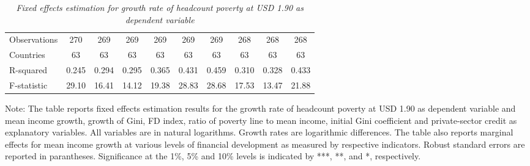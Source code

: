 \documentclass[12pt, a4paper]{article}
\begin{document}
\begin{table}[htbp]
\begin{threeparttable}
{\begin{tabular}{l*{9}{c}}
					
					\hline
					Observations        &         270         &         269         &         269         &         269         &         269         &         269         &         268         &         268         &         268         \\
					Countries           &          63         &          63         &          63         &          63         &          63         &          63         &          63         &          63         &          63         \\
					R-squared           &       0.245         &       0.294         &       0.295         &       0.365         &       0.431         &       0.459         &       0.310         &       0.328         &       0.433         \\
					F-statistic         &       29.10         &       16.41         &       14.12         &       19.38         &       28.83         &       28.68         &       17.53         &       13.47         &       21.88         \\
					\hline\hline
				\end{tabular}
			}
			\begin{tablenotes}
				\item \scriptsize{Note: The table reports fixed effects estimation results for the growth rate of headcount poverty at USD 1.90 as dependent variable and mean income growth, growth of Gini, FD index, ratio of poverty line to mean income, initial Gini coefficient and private-sector credit as explanatory variables. All variables are in natural logarithms. Growth rates are logarithmic differences. The table also reports marginal effects for mean income growth at various levels of financial development as measured by respective indicators. Robust standard errors are reported in parantheses. Significance at the 1\%, 5\% and 10\% levels is indicated by ***, **, and *, respectively.}
			\end{tablenotes}
		\end{threeparttable}
		\caption[Fixed Effects Estimation Results for Headcount Poverty at USD 1.90]{\textit{Fixed effects estimation for growth rate of headcount poverty at USD 1.90 as dependent variable}}
		\label{FE190}
	\end{table}
\end{document}
